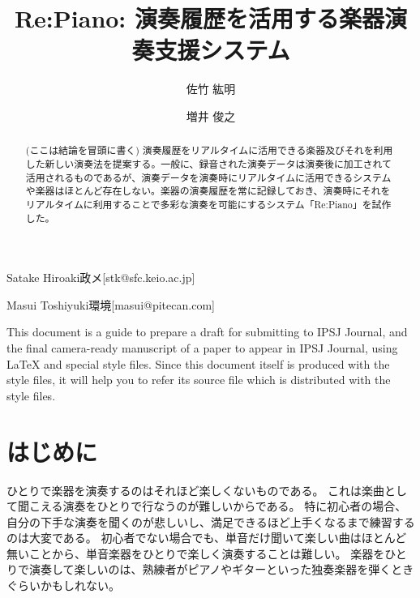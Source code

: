 \documentclass[submit,techreq]{ec2017}
\begin{document}
\title{Re:Piano: 演奏履歴を活用する楽器演奏支援システム}



\author{佐竹 紘明}{Satake Hiroaki}{政メ}[stk@sfc.keio.ac.jp]
\author{増井 俊之}{Masui Toshiyuki}{環境}[masui@pitecan.com]

\begin{abstract}
(ここは結論を冒頭に書く)
演奏履歴をリアルタイムに活用できる楽器及びそれを利用した新しい演奏法を提案する。一般に、録音された演奏データは演奏後に加工されて活用されるものであるが、演奏データを演奏時にリアルタイムに活用できるシステムや楽器はほとんど存在しない。楽器の演奏履歴を常に記録しておき、演奏時にそれをリアルタイムに利用することで多彩な演奏を可能にするシステム「Re:Piano」を試作した。
\end{abstract}


%
\begin{eabstract}
This document is a guide to prepare a draft for submitting to IPSJ
Journal, and the final camera-ready manuscript of a paper to appear in
IPSJ Journal, using {\LaTeX} and special style files.  Since this
document itself is produced with the style files, it will help you to
refer its source file which is distributed with the style files.
\end{eabstract}



\maketitle

\section{はじめに}
\label{sec:start}

ひとりで楽器を演奏するのはそれほど楽しくないものである。
これは楽曲として聞こえる演奏をひとりで行なうのが難しいからである。
特に初心者の場合、 自分の下手な演奏を聞くのが悲しいし、満足できるほど上手くなるまで練習するのは大変である。
初心者でない場合でも、単音だけ聞いて楽しい曲はほとんど無いことから、単音楽器をひとりで楽しく演奏することは難しい。
楽器をひとりで演奏して楽しいのは、熟練者がピアノやギターといった独奏楽器を弾くときぐらいかもしれない。
\end{document}
